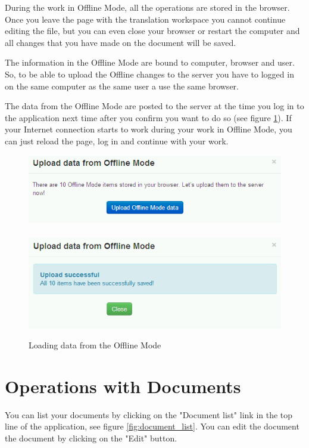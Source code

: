 During the work in Offline Mode, all the operations are stored in the browser. Once you leave the page with the translation workspace you cannot continue editing the file, but you can even close your browser or restart the computer and all changes that you have made on the document will be saved.

The information in the Offline Mode are bound to computer, browser and user. So, to be able to upload the Offline changes to the server you have to logged in on the same computer as the same user a use the same browser.

The data from the Offline Mode are posted to the server at the time you log in to the application next time after you confirm you want to do so (see figure \ref{fig:offline_loading}). If your Internet connection starts to work during your work in Offline Mode, you can just reload the page, log in and continue with your work.

\begin{figure}
\begin{center}
\includegraphics[scale=0.4]{figures/user_manual/upload_offline_mode.png}~~~~\includegraphics[scale=0.4]{figures/user_manual/upload_offline_mode_success.png}
\end{center}
\caption{Loading data from the Offline Mode}
\label{fig:offline_loading}
\end{figure}

\section{Operations with Documents}

You can list your documents by clicking on the "Document list" link in the top line of the application, see figure \ref{fig:document_list}. You can edit the document the document by clicking on the "Edit" button.

